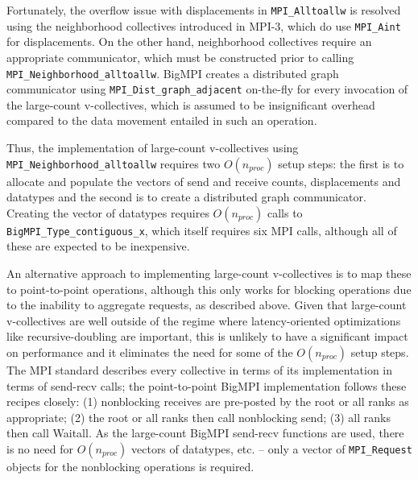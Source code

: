 Fortunately, the overflow issue with displacements in \texttt{MPI\_Alltoallw} is
resolved using the neighborhood collectives introduced in MPI-3, which do
use \texttt{MPI\_Aint} for displacements.
On the other hand, neighborhood collectives require an appropriate
communicator, which must be constructed prior to calling \texttt{MPI\_Neighborhood\_alltoallw}.
BigMPI creates a distributed graph communicator using \texttt{MPI\_Dist\_graph\_adjacent}
on-the-fly for every invocation of the large-count v-collectives, which is assumed to be
insignificant overhead compared to the data movement entailed in such an operation.

Thus, the implementation of large-count v-collectives using \texttt{MPI\_Neighborhood\_alltoallw} 
requires two $O(n_{proc})$ setup steps: the first is to allocate and populate the vectors of 
send and receive counts, displacements and datatypes and 
the second is to create a distributed graph communicator.
Creating the vector of datatypes requires $O(n_{proc})$ calls to \texttt{BigMPI\_Type\_contiguous\_x},
which itself requires six MPI calls, although all of these are expected to be inexpensive.


An alternative approach to implementing large-count v-collectives is to map
these to point-to-point operations, although this only works for blocking operations
due to the inability to aggregate requests, as described above.
Given that large-count v-collectives are well outside of the regime where latency-oriented 
optimizations like recursive-doubling are important, this is unlikely to have a significant impact 
on performance and it eliminates the need for some of the $O(n_{proc})$ setup steps.
The MPI standard describes every collective in terms of its implementation 
in terms of send-recv calls; the point-to-point BigMPI implementation 
follows these recipes closely:
(1) nonblocking receives are pre-posted by the root or all ranks as appropriate;
(2) the root or all ranks then call nonblocking send; 
(3) all ranks then call Waitall.
As the large-count BigMPI send-recv functions are used, there is no need for
$O(n_{proc})$ vectors of datatypes, etc. -- only a vector of \texttt{MPI\_Request}
objects for the nonblocking operations is required.

